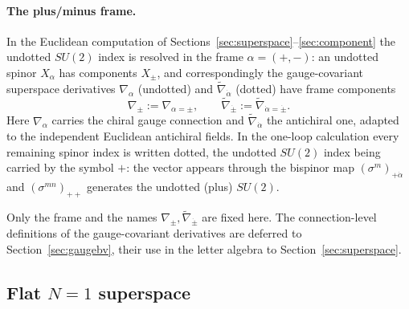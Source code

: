 \paragraph{The plus/minus frame.} In the Euclidean computation of
Sections~\ref{sec:superspace}--\ref{sec:component} the undotted $SU(2)$ index
is resolved in the frame $\alpha=(+,-)$: an undotted spinor $X_\alpha$ has
components $X_\pm$, and correspondingly the gauge-covariant superspace
derivatives $\nabla_\alpha$ (undotted) and $\widetilde\nabla_{\dot\alpha}$
(dotted) have frame components
\begin{equation}
\nabla_\pm:=\nabla_{\alpha=\pm},\qquad
\widetilde\nabla_{\dot\pm}:=\widetilde\nabla_{\dot\alpha=\dot\pm} .
\label{eq:2:pmframe}
\end{equation}
Here $\nabla_\alpha$ carries the chiral gauge connection and
$\widetilde\nabla_{\dot\alpha}$ the antichiral one, adapted to the independent
Euclidean antichiral fields. In the one-loop calculation every remaining
spinor index is written dotted, the undotted $SU(2)$ index being carried by
the symbol $+$: the vector appears through the bispinor map
$(\sigma^m)_{+\dot\alpha}$ and $(\sigma^{mn})_{++}$ generates the undotted
(plus) $SU(2)$.
\begin{remark}\label{rem:2:pmframe}
Only the frame and the names $\nabla_\pm,\widetilde\nabla_{\dot\pm}$ are fixed
here. The connection-level definitions of the gauge-covariant derivatives are
deferred to Section~\ref{sec:gaugebv}, their use in the letter algebra to
Section~\ref{sec:superspace}.
\end{remark}

\subsection{Flat $N=1$ superspace}\label{sec:notation:superspace}

